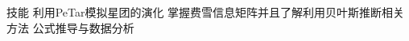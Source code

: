 
\begin{rubric}{技能}
    利用PeTar模拟星团的演化
    \entry*[数据分析]
    掌握费雪信息矩阵并且了解利用贝叶斯推断相关方法
    公式推导与数据分析 
\end{rubric}
